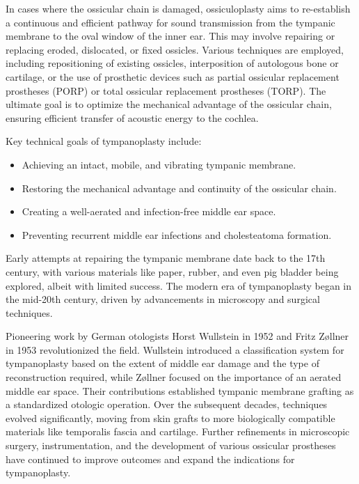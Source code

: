 In cases where the ossicular chain is damaged, ossiculoplasty aims to re-establish a continuous and efficient pathway for sound transmission from the tympanic membrane to the oval window of the inner ear. This may involve repairing or replacing eroded, dislocated, or fixed ossicles. Various techniques are employed, including repositioning of existing ossicles, interposition of autologous bone or cartilage, or the use of prosthetic devices such as partial ossicular replacement prostheses (PORP) or total ossicular replacement prostheses (TORP). The ultimate goal is to optimize the mechanical advantage of the ossicular chain, ensuring efficient transfer of acoustic energy to the cochlea.

Key technical goals of tympanoplasty include:

\begin{itemize}
  \item Achieving an intact, mobile, and vibrating tympanic membrane.
  \item Restoring the mechanical advantage and continuity of the ossicular chain.
  \item Creating a well-aerated and infection-free middle ear space.
  \item Preventing recurrent middle ear infections and cholesteatoma formation.
\end{itemize}

Early attempts at repairing the tympanic membrane date back to the 17th century, with various materials like paper, rubber, and even pig bladder being explored, albeit with limited success. The modern era of tympanoplasty began in the mid-20th century, driven by advancements in microscopy and surgical techniques.

Pioneering work by German otologists Horst Wullstein in 1952 and Fritz Z\o{}llner in 1953 revolutionized the field. Wullstein introduced a classification system for tympanoplasty based on the extent of middle ear damage and the type of reconstruction required, while Z\o{}llner focused on the importance of an aerated middle ear space. Their contributions established tympanic membrane grafting as a standardized otologic operation. Over the subsequent decades, techniques evolved significantly, moving from skin grafts to more biologically compatible materials like temporalis fascia and cartilage. Further refinements in microscopic surgery, instrumentation, and the development of various ossicular prostheses have continued to improve outcomes and expand the indications for tympanoplasty.

